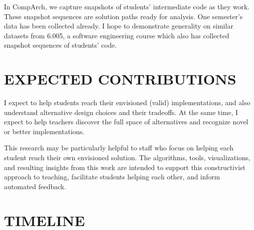 \documentclass[12pt]{article}
\begin{document}
In CompArch, we capture snapshots of students' intermediate code as they work. These snapshot sequences are solution paths ready for analysis. One semester's data has been collected already. I hope to demonstrate generality on similar datasets from 6.005, a software engineering course which also has collected snapshot sequences of students' code.

\section{EXPECTED CONTRIBUTIONS}

I expect to help students reach their envisioned (valid) implementations, and also understand alternative design choices and their tradeoffs. At the same time, I expect to help teachers discover the full space of alternatives and recognize novel or better implementations.


This research may be particularly helpful to staff who focus on helping each student reach their own envisioned solution. The algorithms, tools, visualizations, and resulting insights from this work are intended to support this constructivist approach to teaching, facilitate students helping each other, and inform automated feedback.

\section{TIMELINE}
\end{document}
